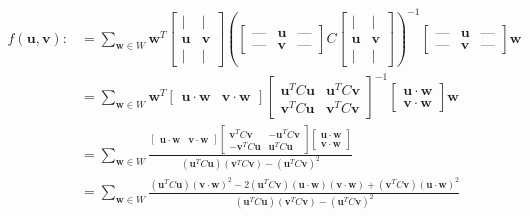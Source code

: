 \documentclass{article}
\renewcommand{\v}[1]{\boldsymbol{#1}}
\begin{document}
\begin{align*}
    f(\v{u}, \v{v}) :&= \sum_{\v{w}\in W} \v{w}^T
    \begin{bmatrix}
        \vert & \vert \\
        \v{u} & \v{v}  \\
        \vert & \vert
    \end{bmatrix}
    \left(
    \begin{bmatrix}
        \text{---} & \v{u} & \text{---}  \\
        \text{---} & \v{v} & \text{---}
    \end{bmatrix}
    C
    \begin{bmatrix}
        \vert & \vert \\
        \v{u} & \v{v}  \\
        \vert & \vert
    \end{bmatrix}
    \right)^{-1} 
    \begin{bmatrix}
        \text{---} & \v{u} & \text{---}  \\
        \text{---} & \v{v} & \text{---}
    \end{bmatrix} 
    \v{w} \\
    &= 
    \sum_{\v{w}\in W} \v{w}^T
    \begin{bmatrix}
        \v{u}\cdot\v{w} & \v{v}\cdot\v{w}
    \end{bmatrix}
    \begin{bmatrix}
        \v{u}^T C \v{u} & \v{u}^T C \v{v}\\
        \v{v}^T C \v{u} & \v{v}^T C \v{v}
    \end{bmatrix}
    ^{-1} 
    \begin{bmatrix}
        \v{u}\cdot\v{w}  \\
        \v{v}\cdot\v{w}
    \end{bmatrix} 
    \v{w}\\
    &=
    \sum_{\v{w}\in W} \frac{
    \begin{bmatrix}
        \v{u}\cdot\v{w} & \v{v}\cdot\v{w}
    \end{bmatrix}
    \begin{bmatrix}
        \v{v}^T C \v{v} & -\v{u}^T C \v{v}\\
        -\v{v}^T C \v{u} & \v{u}^T C \v{u}
    \end{bmatrix}
    \begin{bmatrix}
        \v{u}\cdot\v{w}  \\
        \v{v}\cdot\v{w}
    \end{bmatrix} 
    }
    {(\v{u}^T C \v{u})(\v{v}^T C \v{v}) - (\v{u}^T C \v{v})^2}\\
    &=
    \sum_{\v{w}\in W} \frac{
    (\v{u}^TC\v{u})(\v{v}\cdot\v{w})^2 
    - 2 (\v{u}^TC\v{v})(\v{u}\cdot\v{w})(\v{v}\cdot\v{w})
    + (\v{v}^TC\v{v})(\v{u}\cdot\v{w})^2 
    }
    {(\v{u}^T C \v{u})(\v{v}^T C \v{v}) - (\v{u}^T C \v{v})^2}
\end{align*}
\end{document}
